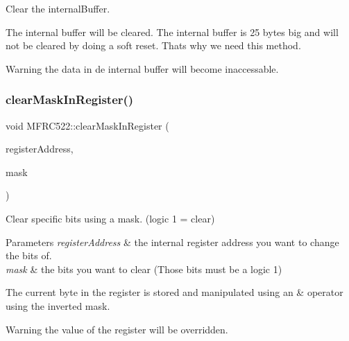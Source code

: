 Clear the internal\+Buffer. 

The internal buffer will be cleared. The internal buffer is 25 bytes big and will not be cleared by doing a soft reset. That\textquotesingle{}s why we need this method. \begin{DoxyWarning}{Warning}
the data in de internal buffer will become inaccessable. 
\end{DoxyWarning}
\mbox{\label{class_m_f_r_c522_a9935264b559702a3a4ad2b87735b4f8f}} 
\subsubsection{\texorpdfstring{clear\+Mask\+In\+Register()}{clearMaskInRegister()}}
{\footnotesize\ttfamily void M\+F\+R\+C522\+::clear\+Mask\+In\+Register (\begin{DoxyParamCaption}\item[{\mbox{\hyperlink{class_m_f_r_c522_ae7ec09eb8c9c61288a4770175b4b8db7}{R\+EG}}}]{register\+Address,  }\item[{uint8\+\_\+t}]{mask }\end{DoxyParamCaption})\hspace{0.3cm}{\ttfamily [protected]}}



Clear specific bits using a mask. (logic 1 = clear) 


\begin{DoxyParams}{Parameters}
{\em register\+Address} & the internal register address you want to change the bits of. \\
\hline
{\em mask} & the bits you want to clear (Those bits must be a logic 1)\\
\hline
\end{DoxyParams}
The current byte in the register is stored and manipulated using an \& operator using the inverted mask. \begin{DoxyWarning}{Warning}
the value of the register will be overridden. 
\end{DoxyWarning}
\mbox{\label{class_m_f_r_c522_ab605cd58a59f1d6cbc48ef0be252e593}} 
